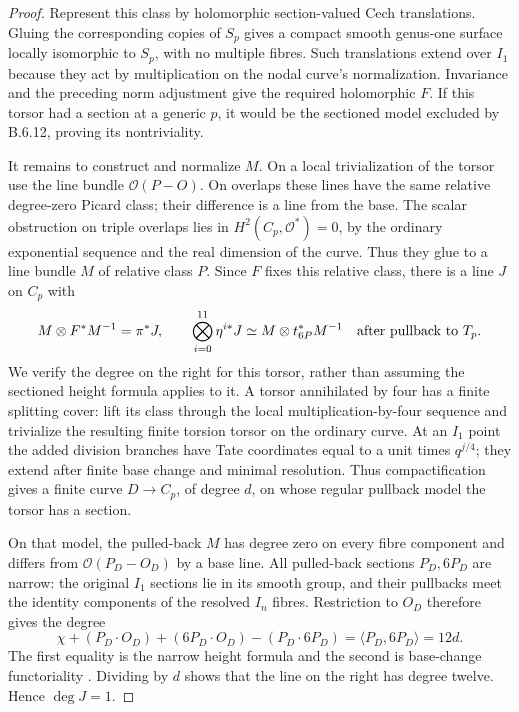 \begin{proof}
Represent this class by holomorphic section-valued Cech
translations. Gluing the corresponding copies of $S_p$
gives a compact smooth genus-one surface locally isomorphic
to $S_p$, with no multiple fibres. Such translations extend
over $I_1$ because they act by multiplication on the nodal
curve's normalization. Invariance and the preceding norm
adjustment give the required holomorphic $F$. If this torsor
had a section at a generic $p$, it would be the sectioned
model excluded by B.6.12, proving its nontriviality.

It remains to construct and normalize $M$. On a local
trivialization of the torsor use the line bundle
$\mathcal O(P-O)$. On overlaps these lines have the same
relative degree-zero Picard class; their difference is a
line from the base. The scalar obstruction on triple
overlaps lies in $H^2(C_p,\mathcal O^*)=0$, by the ordinary
exponential sequence and the real dimension of the curve.
Thus they glue to a line bundle $M$ of relative class $P$.
Since $F$ fixes this relative class, there is a line $J$ on
$C_p$ with
\[
 M\otimes F^*M^{-1}=\pi^*J,\qquad
 \bigotimes_{i=0}^{11}\eta^{i*}J
       \simeq M\otimes t_{6P}^*M^{-1}
       \quad\hbox{after pullback to }T_p.
\]
We verify the degree on the right for this torsor, rather
than assuming the sectioned height formula applies to it.
A torsor annihilated by four has a finite splitting cover:
lift its class through the local multiplication-by-four
sequence and trivialize the resulting finite torsion torsor
on the ordinary curve. At an $I_1$ point the added division
branches have Tate coordinates equal to a unit times
$q^{j/4}$; they extend after finite base change and minimal
resolution. Thus compactification gives a finite curve
$D\to C_p$, of degree $d$, on whose regular pullback model
the torsor has a section.

On that model, the pulled-back $M$ has degree zero on every
fibre component and differs from $\mathcal O(P_D-O_D)$ by
a base line. All pulled-back sections $P_D,6P_D$ are narrow:
the original $I_1$ sections lie in its smooth group, and
their pullbacks meet the identity components of the
resolved $I_n$ fibres. Restriction to $O_D$ therefore gives
the degree
\[
 \chi+(P_D\cdot O_D)+(6P_D\cdot O_D)-(P_D\cdot6P_D)
       =\langle P_D,6P_D\rangle=12d.
\]
The first equality is the narrow height formula and the
second is base-change functoriality
\cite[Theorem 8.6 and Proposition 8.12]{mapsShioda90}.
Dividing by $d$ shows that the line on the right has degree
twelve. Hence $\deg J=1$.


\end{proof}
